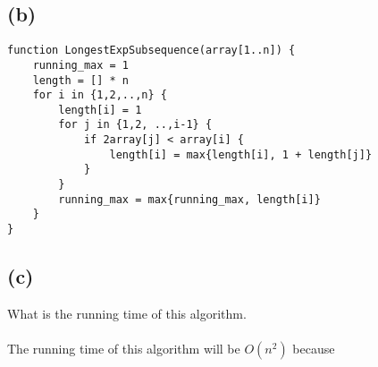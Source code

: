 \documentclass{article}
\begin{document}
\subsection*{(b)}
\begin{verbatim}
function LongestExpSubsequence(array[1..n]) {
    running_max = 1
    length = [] * n
    for i in {1,2,..,n} {
        length[i] = 1
        for j in {1,2, ..,i-1} {
            if 2array[j] < array[i] {
                length[i] = max{length[i], 1 + length[j]}
            }
        }
        running_max = max{running_max, length[i]}
    }
}
\end{verbatim}

\subsection*{(c)}
What is the running time of this algorithm.\\\\
The running time of this algorithm will be $O(n^2)$ because
\end{document}
